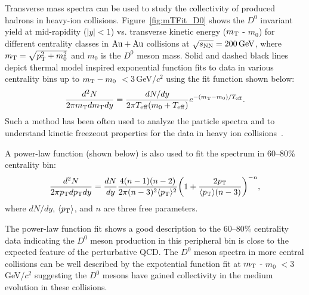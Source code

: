 \documentclass[%
 reprint,	
 amsmath,amssymb,
 aps,
 prc,
]{revtex4-1}
\begin{document}
Transverse mass spectra can be used to study the collectivity of produced hadrons in heavy-ion collisions. Figure~\ref{fig:mTFit_D0} shows the $D^{0}$ invariant yield at mid-rapidity ($|y|<1$) vs. transverse kinetic energy ($m_{\rm T}$ - $m_{0}$) for different centrality classes in ${\rm{Au + Au}}$ collisions at ${\sqrt{s_{\rm NN}} = \rm{200\,GeV}}$, where $m_{\rm T} = \sqrt{p_{\rm T}^2+m_0^2}$ and $m_0$ is the $D^0$ meson mass. Solid and dashed black lines depict thermal model inspired exponential function fits to data in various centrality bins up to $m_{\rm T} - m_{0}$ $<3$\,GeV/$c^2$ using the fit function shown below:
\begin{equation}
  \begin{aligned}
\frac{d^2N}{2\pi m_{\rm T}dm_{\rm T}dy} = \frac{dN/dy}{2\pi T_{\rm eff}(m_0+T_{\rm eff})}e^{-(m_{\rm T}-m_0)/T_{\rm eff}}.
  \end{aligned}
\label{equ:equation5}
\end{equation}
Such a method has been often used to analyze the particle spectra and to understand kinetic freezeout properties for the data in heavy ion collisions~\cite{Kaneta:1999lnf,StarWhitePaper}.


A power-law function (shown below) is also used to fit the spectrum in 60--80\% centrality bin:
\begin{equation}
  \begin{aligned}
\frac{d^2N}{2\pi p_{\rm T}dp_{\rm T}dy} = \frac{dN}{dy}\frac{4(n-1)(n-2)}{2\pi (n-3)^2\langle p_{\rm T} \rangle ^2}\bigg(1+\frac{2p_{\rm T}}{\langle p_{\rm T} \rangle (n-3)}\bigg)^{-n},
  \end{aligned}
\label{equ:equation6}
\end{equation}
where $dN/dy$, $\langle p_{\rm T}\rangle$, and $n$ are three free parameters.

The power-law function fit shows a good description to the 60--80\% centrality data indicating the $D^0$ meson production in this peripheral bin is close to the expected feature of the perturbative QCD. The $D^0$ meson spectra in more central collisions can be well described by the expotential function fit at $m_{\rm T}$ - $m_{0}$ $<3$\,GeV/$c^2$ suggesting the $D^0$ mesons have gained collectivity in the medium evolution in these collisions.


\end{document}

